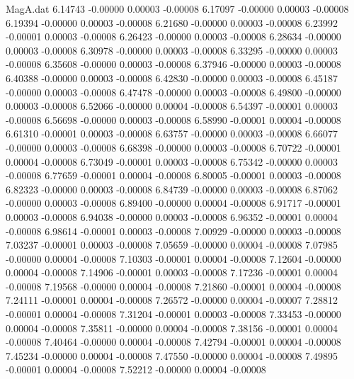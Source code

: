 \begin{filecontents}{MagA.dat}
   6.14743   -0.00000    0.00003   -0.00008
   6.17097   -0.00000    0.00003   -0.00008
   6.19394   -0.00000    0.00003   -0.00008
   6.21680   -0.00000    0.00003   -0.00008
   6.23992   -0.00001    0.00003   -0.00008
   6.26423   -0.00000    0.00003   -0.00008
   6.28634   -0.00000    0.00003   -0.00008
   6.30978   -0.00000    0.00003   -0.00008
   6.33295   -0.00000    0.00003   -0.00008
   6.35608   -0.00000    0.00003   -0.00008
   6.37946   -0.00000    0.00003   -0.00008
   6.40388   -0.00000    0.00003   -0.00008
   6.42830   -0.00000    0.00003   -0.00008
   6.45187   -0.00000    0.00003   -0.00008
   6.47478   -0.00000    0.00003   -0.00008
   6.49800   -0.00000    0.00003   -0.00008
   6.52066   -0.00000    0.00004   -0.00008
   6.54397   -0.00001    0.00003   -0.00008
   6.56698   -0.00000    0.00003   -0.00008
   6.58990   -0.00001    0.00004   -0.00008
   6.61310   -0.00001    0.00003   -0.00008
   6.63757   -0.00000    0.00003   -0.00008
   6.66077   -0.00000    0.00003   -0.00008
   6.68398   -0.00000    0.00003   -0.00008
   6.70722   -0.00001    0.00004   -0.00008
   6.73049   -0.00001    0.00003   -0.00008
   6.75342   -0.00000    0.00003   -0.00008
   6.77659   -0.00001    0.00004   -0.00008
   6.80005   -0.00001    0.00003   -0.00008
   6.82323   -0.00000    0.00003   -0.00008
   6.84739   -0.00000    0.00003   -0.00008
   6.87062   -0.00000    0.00003   -0.00008
   6.89400   -0.00000    0.00004   -0.00008
   6.91717   -0.00001    0.00003   -0.00008
   6.94038   -0.00000    0.00003   -0.00008
   6.96352   -0.00001    0.00004   -0.00008
   6.98614   -0.00001    0.00003   -0.00008
   7.00929   -0.00000    0.00003   -0.00008
   7.03237   -0.00001    0.00003   -0.00008
   7.05659   -0.00000    0.00004   -0.00008
   7.07985   -0.00000    0.00004   -0.00008
   7.10303   -0.00001    0.00004   -0.00008
   7.12604   -0.00000    0.00004   -0.00008
   7.14906   -0.00001    0.00003   -0.00008
   7.17236   -0.00001    0.00004   -0.00008
   7.19568   -0.00000    0.00004   -0.00008
   7.21860   -0.00001    0.00004   -0.00008
   7.24111   -0.00001    0.00004   -0.00008
   7.26572   -0.00000    0.00004   -0.00007
   7.28812   -0.00001    0.00004   -0.00008
   7.31204   -0.00001    0.00003   -0.00008
   7.33453   -0.00000    0.00004   -0.00008
   7.35811   -0.00000    0.00004   -0.00008
   7.38156   -0.00001    0.00004   -0.00008
   7.40464   -0.00000    0.00004   -0.00008
   7.42794   -0.00001    0.00004   -0.00008
   7.45234   -0.00000    0.00004   -0.00008
   7.47550   -0.00000    0.00004   -0.00008
   7.49895   -0.00001    0.00004   -0.00008
   7.52212   -0.00000    0.00004   -0.00008

\end{filecontents}
